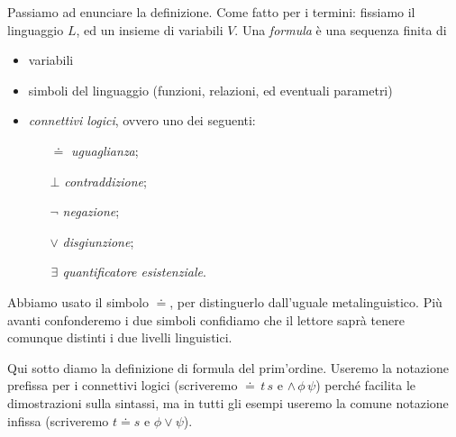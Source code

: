 Passiamo ad enunciare la definizione. Come fatto per i termini: fissiamo il linguaggio $L$, ed un insieme di variabili $V$. Una \emph{formula} \`e una sequenza finita di




\begin{itemize}
\item variabili
\item simboli del linguaggio (funzioni, relazioni, ed eventuali parametri)
\item \emph{connettivi logici}, ovvero uno dei seguenti:

\begin{minipage}[t]{.499\textwidth}
\begin{itemize}
\item[$\doteq$]    \emph{uguaglianza};
\item[$\bot$] \emph{contraddizione};
\item[$\neg$] \emph{negazione};
\end{itemize}
\end{minipage}
\begin{minipage}[t]{.499\textwidth}
\begin{itemize}
\item[$\vee$] \emph{disgiunzione};
\item[$\exists$]   \emph{quantificatore esistenziale}.
\end{itemize}
\end{minipage}
\end{itemize}

Abbiamo usato il simbolo $\doteq$, per distinguerlo dall'uguale metalinguistico. Pi\`u avanti confonderemo i due simboli confidiamo che il lettore sapr\`a tenere comunque distinti i due livelli linguistici. 

Qui sotto diamo la definizione di formula del prim'ordine. Useremo la notazione prefissa per i connettivi logici (scriveremo ${\doteq}\,t\,s$ e ${\wedge}\,\phi\,\psi$) perch\'e facilita le dimostrazioni sulla sintassi, ma in tutti gli esempi useremo la comune notazione infissa (scriveremo $t\doteq s$ e $\phi\vee\psi$).

